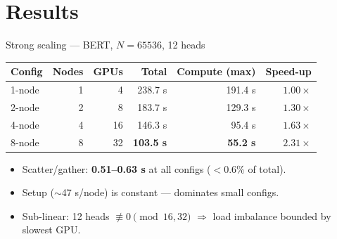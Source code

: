 \documentclass[aspectratio=169]{beamer}
\begin{document}
\section{Results}

\begin{frame}{Strong scaling — BERT, $N{=}65536$, 12 heads}
  \begin{center}
  \begin{tabular}{@{}lrrrrr@{}}
    \toprule
    \textbf{Config} & \textbf{Nodes} & \textbf{GPUs} &
      \textbf{Total} & \textbf{Compute (max)} & \textbf{Speed-up} \\
    \midrule
    1-node & 1 & 4  & 238.7 s & 191.4 s & $1.00\times$ \\
    2-node & 2 & 8  & 183.7 s & 129.3 s & $1.30\times$ \\
    4-node & 4 & 16 & 146.3 s &  95.4 s & $1.63\times$ \\
    8-node & 8 & 32 & \textbf{103.5 s} & \textbf{55.2 s} & $\mathbf{2.31\times}$ \\
    \bottomrule
  \end{tabular}
  \end{center}
  \vspace{0.4em}
  \begin{itemize}\small
    \item Scatter/gather: \textbf{0.51--0.63 s} at all configs ($<0.6$\% of total).
    \item Setup ($\sim$47 s/node) is constant — dominates small configs.
    \item Sub-linear: 12 heads $\not\equiv 0 \pmod{16, 32}$ $\Rightarrow$ load imbalance bounded by slowest GPU.
  \end{itemize}
\end{frame}
\end{document}
